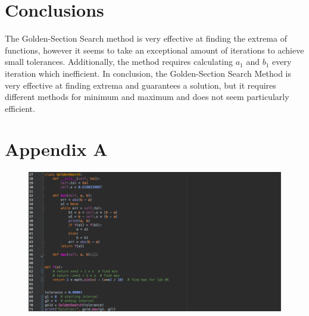 \documentclass[12pt, letterpaper]{article}
\begin{document}
\section{\label{conclusion}Conclusions}
	The Golden-Section Search method is very effective at finding the extrema of functions, however it seems to take an exceptional amount of iterations to achieve small tolerances. Additionally, the method requires calculating $a_1$ and $b_1$ every iteration which inefficient. In conclusion, the Golden-Section Search Method is very effective at finding extrema and guarantees a solution, but it requires different methods for minimum and maximum and does not seem particularly efficient. 

\pagebreak
\appendix
	\section{Appendix A}
            		\begin{figure}[htp]
            			\centering
            			\includegraphics[width=1.0\linewidth]{PythonCode.png}
            		\end{figure}
\end{document}
